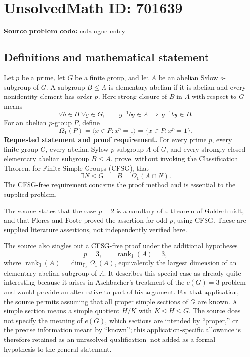 \documentclass[11pt]{article}
\newcommand{\F}{\mathbb{F}}
\begin{document}
\section*{UnsolvedMath ID: 701639}
\textbf{Source problem code:} catalogue entry
\subsection{Definitions and mathematical statement}
Let \(p\) be a prime, let \(G\) be a finite group, and let \(A\) be an abelian Sylow \(p\)-subgroup of \(G\). A subgroup \(B\leq A\) is elementary abelian if it is abelian and every nonidentity element has order \(p\). Here strong closure of \(B\) in \(A\) with respect to \(G\) means
\[
\forall b\in B\;\forall g\in G,\qquad g^{-1}bg\in A\ \Longrightarrow\ g^{-1}bg\in B.
\]
For an abelian \(p\)-group \(P\), define
\[
\Omega_1(P)=\langle x\in P:x^p=1\rangle=\{x\in P:x^p=1\}.
\]
\textbf{Requested statement and proof requirement.} For every prime \(p\), every finite group \(G\), every abelian Sylow \(p\)-subgroup \(A\) of \(G\), and every strongly closed elementary abelian subgroup \(B\leq A\), prove, without invoking the Classification Theorem for Finite Simple Groups (CFSG), that
\[
\exists N\trianglelefteq G\qquad B=\Omega_1(A\cap N).
\]
The CFSG-free requirement concerns the proof method and is essential to the supplied problem.

The source states that the case \(p=2\) is a corollary of a theorem of Goldschmidt, and that Flores and Foote proved the assertion for odd \(p\), using CFSG. These are supplied literature assertions, not independently verified here.

The source also singles out a CFSG-free proof under the additional hypotheses
\[
p=3,\qquad \operatorname{rank}_3(A)=3,
\]
where \(\operatorname{rank}_3(A)=\dim_{\F_3}\Omega_1(A)\), equivalently the largest dimension of an elementary abelian subgroup of \(A\). It describes this special case as already quite interesting because it arises in Aschbacher's treatment of the \(e(G)=3\) problem and would provide an alternative to part of his argument. For that application, the source permits assuming that all proper simple sections of \(G\) are known. A simple section means a simple quotient \(H/K\) with \(K\trianglelefteq H\leq G\). The source does not specify the meaning of \(e(G)\), which sections are intended by ``proper,'' or the precise information meant by ``known''; this application-specific allowance is therefore retained as an unresolved qualification, not added as a formal hypothesis to the general statement.
\end{document}
